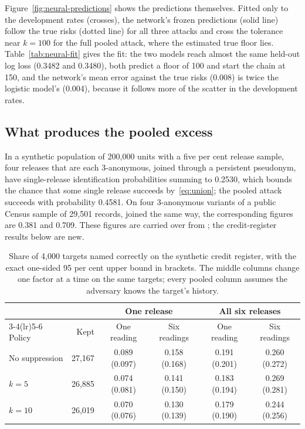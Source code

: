 Figure~\ref{fig:neural-predictions} shows the predictions themselves. Fitted only to the development rates (crosses), the network's frozen predictions (solid line) follow the true risks (dotted line) for all three attacks and cross the tolerance near $k=100$ for the full pooled attack, where the estimated true floor lies. Table~\ref{tab:neural-fit} gives the fit: the two models reach almost the same held-out log loss (0.3482 and 0.3480), both predict a floor of 100 and start the chain at 150, and the network's mean error against the true risks (0.008) is twice the logistic model's (0.004), because it follows more of the scatter in the development rates.




\subsection{What produces the pooled excess}\label{sec:carried}
In a synthetic population of 200,000 units with a five per cent release sample, four releases that are each 3-anonymous, joined through a persistent pseudonym, have single-release identification probabilities summing to 0.2530, which bounds the chance that some single release succeeds by~\eqref{eq:union}; the pooled attack succeeds with probability 0.4581. On four 3-anonymous variants of a public Census sample of 29,501 records, joined the same way, the corresponding figures are 0.381 and 0.709. These figures are carried over from \cite{mahomane2026}; the credit-register results below are new.

\begin{table}[t]\centering\small
\caption{Share of 4,000 targets named correctly on the synthetic credit register, with the exact one-sided 95 per cent upper bound in brackets. The middle columns change one factor at a time on the same targets; every pooled column assumes the adversary knows the target's history.}\label{tab:carried}
\begin{tabular}{lrcccc}
\toprule
 & & \multicolumn{2}{c}{One release} & \multicolumn{2}{c}{All six releases}\\\cmidrule(lr){3-4}\cmidrule(lr){5-6}
Policy & Kept & One reading & Six readings & One reading & Six readings\\\midrule
No suppression & 27{,}167 & 0.089 (0.097) & 0.158 (0.168) & 0.191 (0.201) & 0.260 (0.272)\\
$k=5$ & 26{,}885 & 0.074 (0.081) & 0.141 (0.150) & 0.183 (0.194) & 0.269 (0.281)\\
$k=10$ & 26{,}019 & 0.070 (0.076) & 0.130 (0.139) & 0.179 (0.190) & 0.244 (0.256)\\\bottomrule
\end{tabular}
\end{table}

